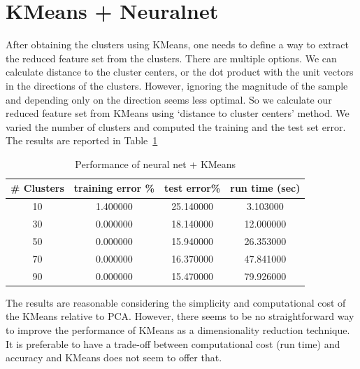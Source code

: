 \documentclass[10pt,letterpaper]{article}
\begin{document}
\section{KMeans + Neuralnet}
After obtaining the clusters using KMeans, one needs to define a way to extract the reduced feature set from the clusters. There are multiple options. We can calculate distance to the cluster centers, or the dot product with the unit vectors in the directions of the clusters. However, ignoring the magnitude of the sample and depending only on the direction seems less optimal. So we calculate our reduced feature set from KMeans using `distance to cluster centers' method. We varied the number of clusters and computed the training and the test set error. The results are reported in Table~\ref{kmnn}
\begin{table}[bp]
\begin{center}
    \begin{tabular}{c|c|c |c}
    \hline
    {\bf \# Clusters}&{\bf training error \%}&{\bf test error\%} & {\bf run time (sec)} \\ \hline
  10  &  1.400000  &   25.140000  &   3.103000\\ 
  30  &  0.000000  &   18.140000  &   12.000000\\ 
  50  &  0.000000  &   15.940000  &   26.353000\\ 
  70  &  0.000000  &   16.370000  &   47.841000\\ 
  90  &  0.000000  &   15.470000  &   79.926000 \\ \hline
\end{tabular}
\end{center}
\caption{Performance of neural net + KMeans \label{kmnn}}
\end{table}
The results are reasonable considering the simplicity and computational cost of the KMeans relative to PCA. However, there seems to be no straightforward way to improve the performance of KMeans as a dimensionality reduction technique. It is preferable to have a trade-off between computational cost (run time) and accuracy and KMeans does not seem to offer that. 
\end{document}
